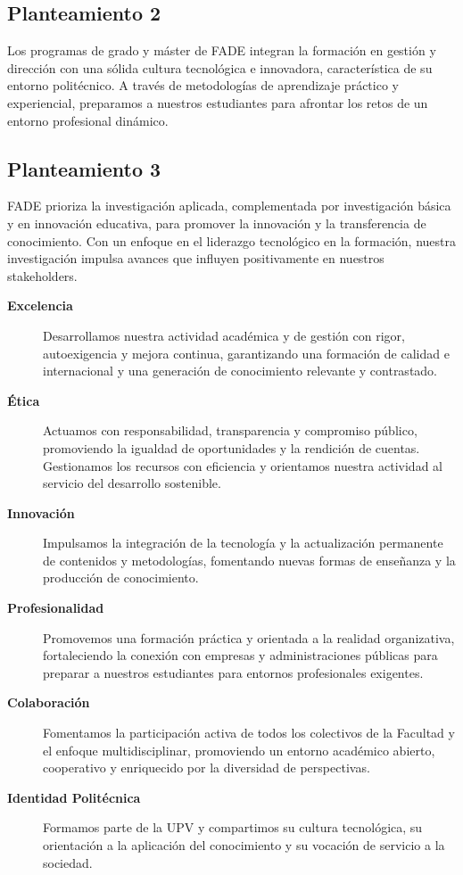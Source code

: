 \documentclass[11pt,a4paper]{scrreprt}
\begin{document}
\subsection*{Planteamiento 2}
\small Los programas de grado y máster de FADE integran la formación en gestión y dirección con una sólida cultura tecnológica e innovadora, característica de su entorno politécnico. A través de metodologías de aprendizaje práctico y experiencial, preparamos a nuestros estudiantes para afrontar los retos de un entorno profesional dinámico.

\subsection*{Planteamiento 3}
\small FADE prioriza la investigación aplicada, complementada por investigación básica y en innovación educativa, para promover la innovación y la transferencia de conocimiento. Con un enfoque en el liderazgo tecnológico en la formación, nuestra investigación impulsa avances que influyen positivamente en nuestros stakeholders.

\begin{description}
\item[\textbf{Excelencia}]
\small Desarrollamos nuestra actividad académica y de gestión con rigor, autoexigencia y mejora continua, garantizando una formación de calidad e internacional y una generación de conocimiento relevante y contrastado.
\item[\textbf{Ética}]
\small Actuamos con responsabilidad, transparencia y compromiso público, promoviendo la igualdad de oportunidades y la rendición de cuentas. Gestionamos los recursos con eficiencia y orientamos nuestra actividad al servicio del desarrollo sostenible.
\item[\textbf{Innovación}]
\small Impulsamos la integración de la tecnología y la actualización permanente de contenidos y metodologías, fomentando nuevas formas de enseñanza y la producción de conocimiento.
\item[\textbf{Profesionalidad}]
\small Promovemos una formación práctica y orientada a la realidad organizativa, fortaleciendo la conexión con empresas y administraciones públicas para preparar a nuestros estudiantes para entornos profesionales exigentes.
\item[\textbf{Colaboración}]
\small Fomentamos la participación activa de todos los colectivos de la Facultad y el enfoque multidisciplinar, promoviendo un entorno académico abierto, cooperativo y enriquecido por la diversidad de perspectivas.
\item[\textbf{Identidad Politécnica}]
\small Formamos parte de la UPV y compartimos su cultura tecnológica, su orientación a la aplicación del conocimiento y su vocación de servicio a la sociedad.
\end{description}
\end{document}
